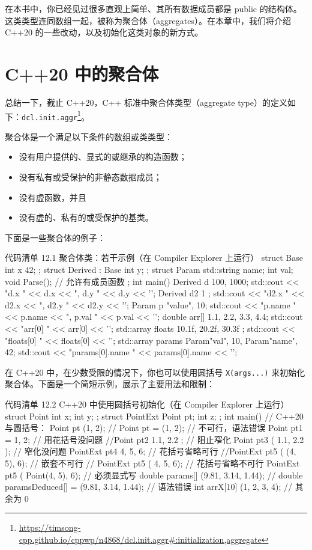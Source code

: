 在本书中，你已经见过很多直观上简单、其所有数据成员都是 public 的结构体。这类类型连同数组一起，被称为聚合体（aggregates）。在本章中，我们将介绍 C++20 的一些改动，以及初始化这类对象的新方式。

\section{C++20 中的聚合体}

总结一下，截止 C++20，C++ 标准中聚合体类型（aggregate type）的定义如下：\texttt{dcl.init.aggr}\footnote{\url{https://timsong-cpp.github.io/cppwp/n4868/dcl.init.aggr\#:initialization,aggregate}}。

\begin{myQuote}
聚合体是一个满足以下条件的数组或类类型：

\begin{itemize}
\item 没有用户提供的、显式的或继承的构造函数；
\item 没有私有或受保护的非静态数据成员；
\item 没有虚函数，并且
\item 没有虚的、私有的或受保护的基类。
\end{itemize}
\end{myQuote}

下面是一些聚合体的例子：

\begin{codeboxt}[cpp]{代码清单 12.1 聚合体类：若干示例（在 Compiler Explorer 上运行）}
struct Base { int x {42}; };
struct Derived : Base { int y; };
struct Param {
std::string name;
int val;
void Parse();
// 允许有成员函数
};
int main() {
Derived d {100, 1000};
std::cout << "d.x " << d.x << ", d.y " << d.y << '\n';
Derived d2 { 1 };
std::cout << "d2.x " << d2.x << ", d2.y " << d2.y << '\n';
Param p {"value", 10};
std::cout << "p.name " << p.name << ", p.val " << p.val << '\n';
double arr[] { 1.1, 2.2, 3.3, 4.4};
std::cout << "arr[0] " << arr[0] << '\n';
std::array floats { 10.1f, 20.2f, 30.3f };
std::cout << "floats[0] " << floats[0] << '\n';
std::array params {Param{"val", 10}, Param{"name", 42}};
std::cout << "params[0].name " << params[0].name << '\n';
}
\end{codeboxt}

在 C++20 中，在少数受限的情况下，你也可以使用圆括号 \texttt{X(args...)} 来初始化聚合体。下面是一个简短示例，展示了主要用法和限制：

\begin{codeboxt}[cpp]{代码清单 12.2 C++20 中使用圆括号初始化（在 Compiler Explorer 上运行）}
struct Point { int x; int y; };
struct PointExt { Point pt; int z; };
int main() {
// C++20 与圆括号：
Point pt (1, 2);
// Point pt = (1, 2); // 不可行，语法错误
Point pt1 = {1, 2}; // 用花括号没问题
//Point pt2 { 1.1, 2.2 }; // 阻止窄化
Point pt3 ( 1.1, 2.2 );
// 窄化没问题
PointExt pt4 { 4, 5, 6};
// 花括号省略可行
//PointExt pt5 ( (4, 5), 6); // 嵌套不可行
// PointExt pt5 ( 4, 5, 6);
// 花括号省略不可行
PointExt pt5 ( Point(4, 5), 6); // 必须显式写
double params[] (9.81, 3.14, 1.44);
// double paramsDeduced[] = (9.81, 3.14, 1.44); // 语法错误
int arrX[10]
(1, 2, 3, 4); // 其余为 0
}
\end{codeboxt}


